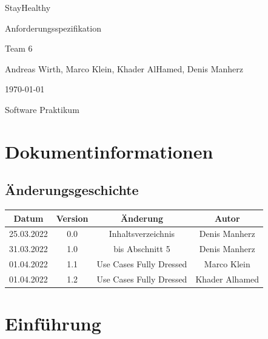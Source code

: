 \documentclass[12pt,a4paper,onecolumn]{article}
\newcommand\titleofdoc{StayHealthy} %
\newcommand\GroupName{Team 6} %
\begin{document}
\begin{titlepage}
   \begin{center}
        \vspace*{4cm} %

        \Huge{\titleofdoc} 

        \vspace{0.5cm}
        \LARGE{Anforderungsspezifikation}
            
        \vspace{3 cm}
        \Large{\GroupName}
       
        \vspace{0.25cm}
        \large{Andreas Wirth, Marco Klein, Khader AlHamed, Denis Manherz}
       
        \vspace{3 cm}
        \Large{\today}%
        
        \vspace{0.25 cm}
        \Large{Software Praktikum}
       

       \vfill
    \end{center}
\end{titlepage}
\setcounter{page}{2}
\tableofcontents
\newpage

\section{Dokumentinformationen} 
\subsection{Änderungsgeschichte}
\begin{center}
\begin{tabular}{ |c|c|c|c| } 
 \hline
 Datum & Version & Änderung & Autor\\ 
 \hline
 25.03.2022 & 0.0 & Inhaltsverzeichnis & Denis Manherz \\ 
 \hline
 31.03.2022 & 1.0 & bis Abschnitt 5 & Denis Manherz \\ 
 \hline
 01.04.2022 & 1.1 & Use Cases Fully Dressed & Marco Klein \\ 
 \hline
 01.04.2022 & 1.2 & Use Cases Fully Dressed & Khader Alhamed \\ 
 \hline
\end{tabular}
\end{center}

\section{Einführung}
\end{document}
